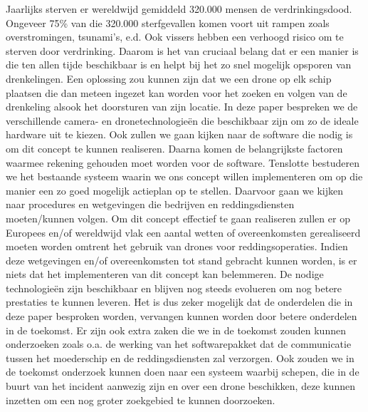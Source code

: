 Jaarlijks sterven er wereldwijd gemiddeld 320.000 mensen de verdrinkingsdood. Ongeveer 75\% van die 320.000 sterfgevallen komen voort uit rampen zoals overstromingen, tsunami's, e.d. Ook vissers hebben een verhoogd risico om te sterven door verdrinking. Daarom is het van cruciaal belang dat er een manier is die ten allen tijde beschikbaar is en helpt bij het zo snel mogelijk opsporen van drenkelingen. Een oplossing zou kunnen zijn dat we een drone op elk schip plaatsen die dan meteen ingezet kan worden voor het zoeken en volgen van de drenkeling alsook het doorsturen van zijn locatie. In deze paper bespreken we de verschillende camera- en dronetechnologieën die beschikbaar zijn om zo de ideale hardware uit te kiezen. Ook zullen we gaan kijken naar de software die nodig is om dit concept te kunnen realiseren. Daarna komen de belangrijkste factoren waarmee rekening gehouden moet worden voor de software.
Tenslotte bestuderen we het bestaande systeem waarin we ons concept willen implementeren om op die manier een zo goed mogelijk actieplan op te stellen. Daarvoor gaan we kijken naar procedures en wetgevingen die bedrijven en reddingsdiensten moeten/kunnen volgen. Om dit concept effectief te gaan realiseren zullen er op Europees en/of wereldwijd vlak een aantal wetten of overeenkomsten gerealiseerd moeten worden omtrent het gebruik van drones voor reddingsoperaties. Indien deze wetgevingen en/of overeenkomsten tot stand gebracht kunnen worden, is er niets dat het implementeren van dit concept kan belemmeren. De nodige technologieën zijn beschikbaar en blijven nog steeds evolueren om nog betere prestaties te kunnen leveren. Het is dus zeker mogelijk dat de onderdelen die in deze paper besproken worden, vervangen kunnen worden door betere onderdelen in de toekomst. Er zijn ook extra zaken die we in de toekomst zouden kunnen onderzoeken zoals o.a. de werking van het softwarepakket dat de communicatie tussen het moederschip en de reddingsdiensten zal verzorgen. Ook zouden we in de toekomst onderzoek kunnen doen naar een systeem waarbij schepen, die in de buurt van het incident aanwezig zijn en over een drone beschikken, deze kunnen inzetten om een nog groter zoekgebied te kunnen doorzoeken.
